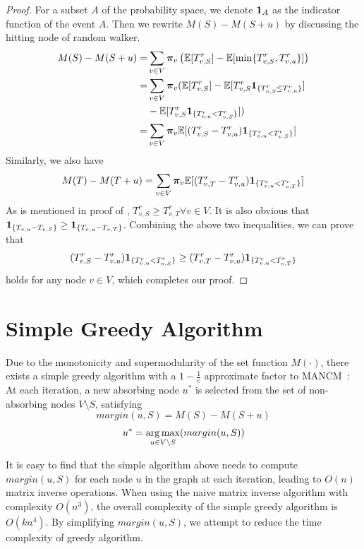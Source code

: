 \documentclass[sigconf]{acmart}
\begin{document}
\begin{proof}
    For a subset \(A\) of the probability space, we denote \(\boldsymbol{1}_A\) as the indicator function of the event \(A\). Then we rewrite \(M(S)-M(S+u)\) by discussing the hitting node of random walker.
    \begin{align*}
        M(S)-M(S+u)
        = & \sum_{v\in V}\boldsymbol{\pi}_v\left(\mathbb{E}[T_{v,S}^r]-\mathbb{E}[\min\{T_{v,S}^r,T_{v,u}^r \}]\right)      \\
        = & \sum_{v\in V}\boldsymbol{\pi}_v(\mathbb{E}[T_{v,S}^r]-\mathbb{E}[T_{v,S}^r\boldsymbol{1}_{\{T_{v,S}^r\le T_{v,u}^r\}}] \\
          & -\mathbb{E}[T_{v,S}^r\boldsymbol{1}_{\{T_{v,u}^r<T_{v,S}^r\}}])                                         \\
        = & \sum_{v\in V}\boldsymbol{\pi}_v\mathbb{E}[(T_{v,S}^r-T_{v,u}^r)\boldsymbol{1}_{\{T_{v,u}^r<T_{v,S}^r\}}]
    \end{align*}
    Similarly, we also have
    \[M(T)-M(T+u)=\sum_{v\in V}\boldsymbol{\pi}_v\mathbb{E}[(T_{v,T}^r-T_{v,u}^r)\boldsymbol{1}_{\{T_{v,u}^r<T_{v,T}^r\}}]\]
    As is mentioned in proof of , \(T_{v,S}^r\ge T_{v,T}^r\forall v\in V\).
    It is also obvious that \(\boldsymbol{1}_{\{T_{v,u}-T_{v,S}\}}\ge\boldsymbol{1}_{\{T_{v,u}-T_{v,T}\}}\).
    Combining the above two inequalities, we can prove that
    \[(T_{v,S}^r-T_{v,u}^r)\boldsymbol{1}_{\{T_{v,u}^r<T_{v,S}^r\}}\ge(T_{v,T}^r-T_{v,u}^r)\boldsymbol{1}_{\{T_{v,u}^r<T_{v,T}^r\}}\]
    holds for any node \(v\in V\), which completes our proof.
\end{proof}

\section{Simple Greedy Algorithm}

Due to the monotonicity and supermodularity of the set function \(M(\cdot)\), there exists a simple greedy algorithm with a \(1-\frac1e\) approximate factor to MANCM~\cite{NeWoFi78}:
At each iteration, a new absorbing node \(u^*\) is selected from the set of non-absorbing nodes \(V\setminus S\), satisfying
\[margin(u,S)=M(S)-M(S+u)\]
\[u^*=\operatorname*{arg\,max}_{u\in V\setminus S}(margin(u,S))\]

It is easy to find that the simple algorithm above needs to compute \(margin(u,S)\) for each node \(u\) in the graph at each iteration, leading to \(O(n)\) matrix inverse operations.
When using the naive matrix inverse algorithm with complexity \(O(n^3)\), the overall complexity of the simple greedy algorithm is \(O(kn^4)\).
By simplifying \(margin(u,S)\), we attempt to reduce the time complexity of greedy algorithm.
\end{document}
